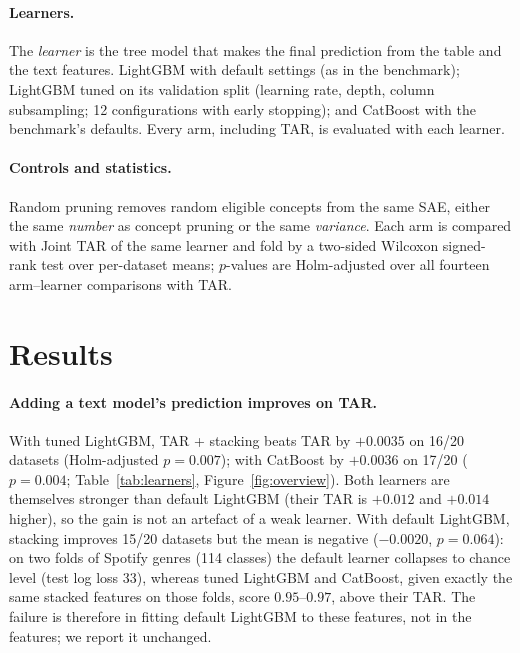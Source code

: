 \documentclass{article}
\begin{document}
\paragraph{Learners.} The \emph{learner} is the tree model that makes the final prediction from the table and the text features. LightGBM \citep{ke2017lightgbm} with default settings (as in the benchmark); LightGBM tuned on its validation split
(learning rate, depth, column subsampling; 12 configurations with early stopping); and CatBoost \citep{prokhorenkova2018catboost} with the benchmark's defaults. Every arm, including TAR, is evaluated with each learner.

\paragraph{Controls and statistics.} Random pruning removes random eligible concepts from the same SAE, either the
same \emph{number} as concept pruning or the same \emph{variance}. Each arm is compared with Joint TAR of the same
learner and fold by a two-sided Wilcoxon signed-rank test over per-dataset means; $p$-values are Holm-adjusted over
all fourteen arm--learner comparisons with TAR.

\section{Results}\label{sec:results}





\paragraph{Adding a text model's prediction improves on TAR.} With tuned LightGBM, TAR + stacking beats TAR by
$+0.0035$ on 16/20 datasets (Holm-adjusted $p=0.007$); with CatBoost by $+0.0036$ on 17/20 ($p=0.004$;
Table~\ref{tab:learners}, Figure~\ref{fig:overview}). Both learners are themselves stronger than default LightGBM (their TAR is $+0.012$ and
$+0.014$ higher), so the gain is not an artefact of a weak learner. With default LightGBM, stacking improves 15/20
datasets but the mean is negative ($-0.0020$, $p=0.064$): on two folds of Spotify genres (114 classes) the default
learner collapses to chance level (test log loss 33), whereas tuned LightGBM and CatBoost, given exactly the same
stacked features on those folds, score $0.95$--$0.97$, above their TAR. The failure is therefore in fitting default
LightGBM to these features, not in the features; we report it unchanged.
\end{document}
